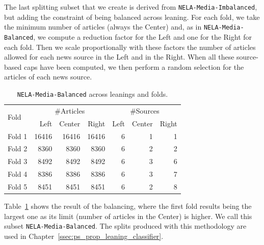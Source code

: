 The last splitting subset that we create is derived from \texttt{NELA-Media-Imbalanced}, but adding the constraint of being balanced across leaning.
For each fold, we take the minimum number of articles (always the Center) and, as in \texttt{NELA-Media-Balanced}, we compute a reduction factor for the Left and one for the Right for each fold. Then we scale proportionally with these factors the number of articles allowed for each news source in the Left and in the Right. When all these source-based caps have been computed, we then perform a random selection for the articles of each news source.

\begin{table}[!htbp]
    \centering
    \begin{tabular}{l|rrr|rrr}
        \multirow{2}{*}{Fold} & \multicolumn{3}{c}{\#Articles} & \multicolumn{3}{c}{\#Sources}                                 \\
                              & Left                           & Center                        & Right & Left & Center & Right \\
        \hline
        Fold 1                & 16416                          & 16416                         & 16416 & 6    & 1      & 1     \\
        Fold 2                & 8360                           & 8360                          & 8360  & 6    & 2      & 2     \\
        Fold 3                & 8492                           & 8492                          & 8492  & 6    & 3      & 6     \\
        Fold 4                & 8386                           & 8386                          & 8386  & 6    & 3      & 7     \\
        Fold 5                & 8451                           & 8451                          & 8451  & 6    & 2      & 8     \\
    \end{tabular}
    \caption{\texttt{NELA-Media-Balanced} across leanings and folds.}
    \label{tab:nela_media_balanced}
\end{table}

Table~\ref{tab:nela_media_balanced} shows the result of the balancing, where the first fold results being the largest one as its limit (number of articles in the Center) is higher.
We call this subset \texttt{NELA-Media-Balanced}.
%
The splits produced with this methodology are used in Chapter~\ref{ssec:ps_prop_leaning_classifier}.
